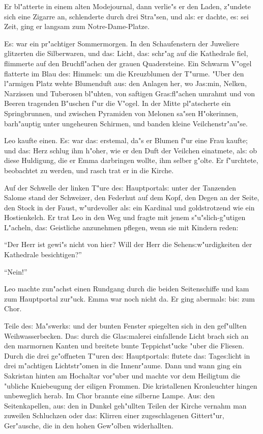 \documentclass[oneside,12pt]{book}
\newcommand{\s}{s:}%
\begin{document}
Er bl"atterte in einem alten Modejournal, dann verlie"s er den
Laden, z"undete sich eine Zigarre an, schlenderte durch drei
Stra"sen, und al{\s} er dachte, e{\s} sei Zeit, ging er langsam
zum Notre-Dame-Platze.

E{\s} war ein pr"achtiger Sommermorgen. In den Schaufenstern der
Juweliere glitzerten die Silberwaren, und da{\s} Licht, da{\s}
schr"ag auf die Kathedrale fiel, flimmerte auf den Bruchfl"achen
der grauen Quadersteine. Ein Schwarm V"ogel flatterte im Blau
de{\s} Himmel{\s} um die Kreuzblumen der T"urme. "Uber den
l"armigen Platz wehte Blumenduft au{\s} den Anlagen her, wo
Ja{\s}min, Nelken, Narzissen und Tuberosen bl"uhten, von saftigen
Gra{\s}fl"achen umrahmt und von Beeren tragenden B"uschen f"ur die
V"ogel. In der Mitte pl"atscherte ein Springbrunnen, und zwischen
Pyramiden von Melonen sa"sen H"okerinnen, barh"auptig unter
ungeheuren Schirmen, und banden kleine Veilchenstr"au"se.

Leo kaufte einen. E{\s} war da{\s} erstemal, da"s er Blumen f"ur
eine Frau kaufte; und da{\s} Herz schlug ihm h"oher, wie er den
Duft der Veilchen einatmete, al{\s} ob diese Huldigung, die er
Emma darbringen wollte, ihm selber g"olte. Er f"urchtete,
beobachtet zu werden, und rasch trat er in die Kirche.

Auf der Schwelle der linken T"ure de{\s} Hauptportal{\s} unter der
{\glq}Tanzenden Salome{\grq} stand der Schweizer, den Federhut auf
dem Kopf, den Degen an der Seite, den Stock in der Faust,
w"urdevoller al{\s} ein Kardinal und goldstrotzend wie ein
Hostienkelch. Er trat Leo in den Weg und fragte mit jenem
s"u"slich-g"utigen L"acheln, da{\s} Geistliche anzunehmen pflegen,
wenn sie mit Kindern reden:

"`Der Herr ist gewi"s nicht von hier? Will der Herr die
Sehen{\s}w"urdigkeiten der Kathedrale besichtigen?"'

"`Nein!"'

Leo machte zun"achst einen Rundgang durch die beiden Seitenschiffe
und kam zum Hauptportal zur"uck. Emma war noch nicht da. Er ging
abermal{\s} bi{\s} zum Chor.

Teile de{\s} Ma"swerk{\s} und der bunten Fenster spiegelten sich
in den gef"ullten Weihwasserbecken. Da{\s} durch die
Gla{\s}malerei einfallende Licht brach sich an den marmornen
Kanten und breitete bunte Teppichst"ucke "uber die Fliesen. Durch
die drei ge"offneten T"uren de{\s} Hauptportal{\s} flutete da{\s}
Tage{\s}licht in drei m"achtigen Lichtstr"omen in die Innenr"aume.
Dann und wann ging ein Sakristan hinten am Hochaltar vor"uber und
machte vor dem Heiligtum die "ubliche Kniebeugung der eiligen
Frommen. Die kristallenen Kronleuchter hingen unbeweglich herab.
Im Chor brannte eine silberne Lampe. Au{\s} den Seitenkapellen,
au{\s} den in Dunkel geh"ullten Teilen der Kirche vernahm man
zuweilen Schluchzen oder da{\s} Klirren einer zugeschlagenen
Gittert"ur, Ger"ausche, die in den hohen Gew"olben widerhallten.
\end{document}
